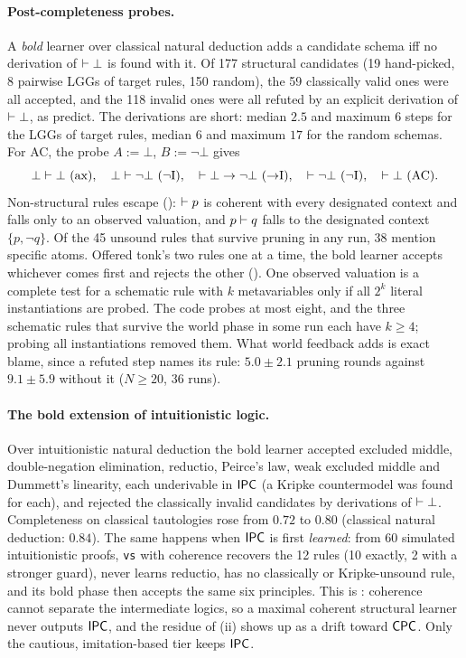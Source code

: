 \paragraph{Post-completeness probes.} A \emph{bold} learner over classical natural deduction adds a candidate schema iff no derivation of $\vdash\bot$ is found with it. Of 177 structural candidates (19 hand-picked, 8 pairwise LGGs of target rules, 150 random), the 59 classically valid ones were all accepted, and the 118 invalid ones were all refuted by an explicit derivation of $\vdash\bot$, as  predict. The derivations are short: median $2.5$ and maximum $6$ steps for the LGGs of target rules, median $6$ and maximum $17$ for the random schemas. For AC, the probe $A:=\bot$, $B:=\neg\bot$ gives
\[
\bot\der\bot\ (\text{ax}),\quad \bot\der\neg\bot\ (\neg\text{I}),\quad \der\bot\to\neg\bot\ ({\to}\text{I}),\quad \der\neg\bot\ (\neg\text{I}),\quad \der\bot\ (\text{AC}).
\]
Non-structural rules escape (): $\vdash p$ is coherent with every designated context and falls only to an observed valuation, and $p\vdash q$ falls to the designated context $\{p,\neg q\}$. Of the 45 unsound rules that survive pruning in any run, 38 mention specific atoms. Offered tonk's two rules one at a time, the bold learner accepts whichever comes first and rejects the other (). One observed valuation is a complete test for a schematic rule with $k$ metavariables only if all $2^k$ literal instantiations are probed. The code probes at most eight, and the three schematic rules that survive the world phase in some run each have $k\ge4$; probing all instantiations removed them. What world feedback adds is exact blame, since a refuted step names its rule: $5.0\pm2.1$ pruning rounds against $9.1\pm5.9$ without it ($N\ge20$, 36 runs).

\paragraph{The bold extension of intuitionistic logic.} Over intuitionistic natural deduction the bold learner accepted excluded middle, double-negation elimination, reductio, Peirce's law, weak excluded middle and Dummett's linearity, each underivable in $\mathsf{IPC}$ (a Kripke countermodel was found for each), and rejected the classically invalid candidates by derivations of $\vdash\bot$. Completeness on classical tautologies rose from $0.72$ to $0.80$ (classical natural deduction: $0.84$). The same happens when $\mathsf{IPC}$ is first \emph{learned}: from 60 simulated intuitionistic proofs, \texttt{vs} with coherence recovers the 12 rules (10 exactly, 2 with a stronger guard), never learns reductio, has no classically or Kripke-unsound rule, and its bold phase then accepts the same six principles. This is : coherence cannot separate the intermediate logics, so a maximal coherent structural learner never outputs $\mathsf{IPC}$, and the residue of (ii) shows up as a drift toward $\mathsf{CPC}$. Only the cautious, imitation-based tier keeps $\mathsf{IPC}$.

